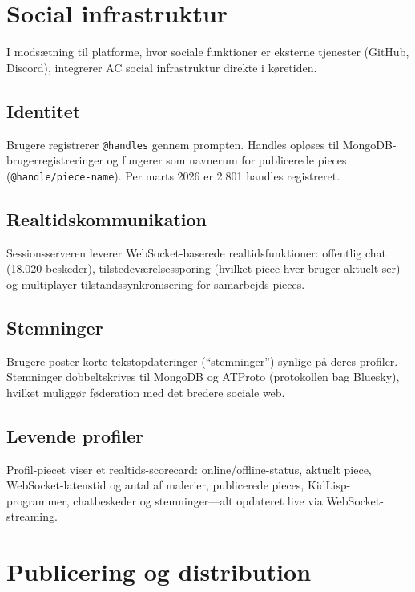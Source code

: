 \documentclass[10pt,letterpaper,twocolumn]{article}
\begin{document}
\section{Social infrastruktur}
\label{sec:social}

I modsætning til platforme, hvor sociale funktioner er eksterne tjenester (GitHub, Discord), integrerer AC social infrastruktur direkte i køretiden.

\subsection{Identitet}

Brugere registrerer \texttt{@handles} gennem prompten. Handles opløses til MongoDB-brugerregistreringer og fungerer som navnerum for publicerede pieces (\texttt{@handle/piece-name}). Per marts 2026 er 2.801 handles registreret.

\subsection{Realtidskommunikation}

Sessionsserveren leverer WebSocket-baserede realtidsfunktioner: offentlig chat (18.020 beskeder), tilstedeværelsessporing (hvilket piece hver bruger aktuelt ser) og multiplayer-tilstandssynkronisering for samarbejds-pieces.

\subsection{Stemninger}

Brugere poster korte tekstopdateringer (``stemninger'') synlige på deres profiler. Stemninger dobbeltskrives til MongoDB og ATProto (protokollen bag Bluesky), hvilket muliggør føderation med det bredere sociale web.

\subsection{Levende profiler}

Profil-piecet viser et realtids-scorecard: online/offline-status, aktuelt piece, WebSocket-latenstid og antal af malerier, publicerede pieces, KidLisp-programmer, chatbeskeder og stemninger---alt opdateret live via WebSocket-streaming.


\section{Publicering og distribution}
\label{sec:publishing}
\end{document}
